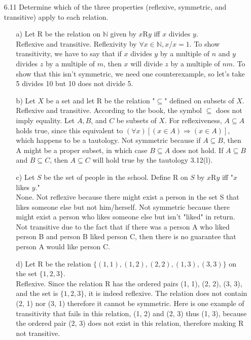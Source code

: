 \documentclass[12pt]{article}
\begin{document}
\begin{enumerate}
\item[6.11] Determine which of the three properties (reflexive, symmetric, and transitive) apply to each relation.
\begin{enumerate}
\item[a)] Let {\large R} be the relation on $\mathbb{N}$ given by $x${\large R}$y$ iff $x$ divides $y$.\\
Reflexive and transitive. Reflexivity by $\forall x \in \mathbb{N}, x$/$x = 1$. To show transitivity, we have
to say that if $x$ divides $y$ by a multiple of $n$ and $y$ divides $z$ by a multiple of $m$, then 
$x$ will divide $z$ by a multiple of $nm$. To show that this isn't symmetric, we need one counterexample, so let's take 5 divides 10 but 10 does not divide 5.
\item[b)] Let $X$ be a set and let {\large R} be the relation "$\subseteq$" defined on subsets of $X$. \\
Reflexive and transitive. According to the book, the symbol $\subseteq$ does not imply equality.
Let $A, B$, and $C$ be subsets of $X$. For reflexiveness, $A \subseteq A$ holds true, since this equivalent to $(\forall x)[(x \in A) \Rightarrow (x \in A)]$, which happens to be a tautology. Not symmetric because if $A \subseteq B$, then A might be a proper subset, in which case $B \subseteq A$ does not hold. If $A \subseteq B$ and $B \subseteq C$, then $A \subseteq C$ will hold true by the tautology 3.12(l).
\item[c)] Let $S$ be the set of people in the school. Define {\large R} on $S$ by $x${\large R}$y$ iff "$x$ likes $y$." \\
None. Not reflexive because there might exist a person in the set S that likes someone else but not
him/herself. Not symmetric because there might exist a person who likes someone else but isn't "liked" in return.
Not transitive due to the fact that if there was a person A who liked person B and person B liked person C, then
there is no guarantee that person A would like person C.
\item[d)] Let {\large R} be the relation $\{ (1, 1), (1, 2), (2, 2), (1, 3), (3, 3) \}$ on the set $\{ 1, 2, 3 \}$. \\ 
Reflexive. Since the relation {\large R} has the ordered pairs (1, 1), (2, 2), (3, 3), and the set is $\{1, 2, 3\}$, it is indeed reflexive. The relation does not contain (2, 1) nor (3, 1) therefore it cannot be
symmetric. Here is one example of transitivity that fails in this relation, (1, 2) and (2, 3) thus (1, 3), because the ordered pair (2, 3) does not exist in this relation, therefore making {\large R} not transitive.

\end{enumerate}
\end{enumerate}
\end{document}

